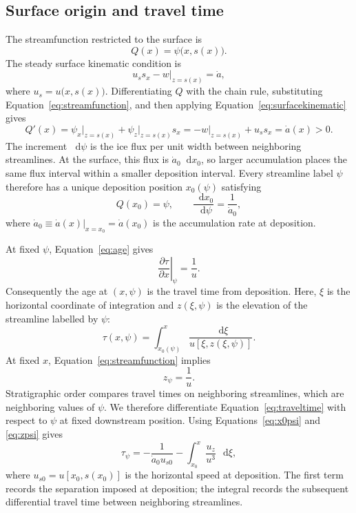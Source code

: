 \documentclass[review]{igs}
\theoremstyle{definition}
\theoremstyle{remark}
\newcommand{\dd}{\mathop{}\!\mathrm{d}}
\begin{document}
\subsection{Surface origin and travel time}

The streamfunction restricted to the surface is
\begin{equation}
Q(x)=\psi\bigl(x,s(x)\bigr).
\end{equation}
The steady surface kinematic condition is
\begin{equation}
 u_s s_x-w\bigg|_{z=s(x)}=\dot a,
\label{eq:surfacekinematic}
\end{equation}
where \(u_s=u\bigl(x,s(x)\bigr)\). Differentiating \(Q\) with the chain rule, substituting Equation~\eqref{eq:streamfunction}, and then applying Equation~\eqref{eq:surfacekinematic} gives
\begin{equation}
Q'(x)
=\psi_x\bigg|_{z=s(x)}+\psi_z\bigg|_{z=s(x)}s_x
=-w\bigg|_{z=s(x)}+u_ss_x
=\dot a(x)>0.
\label{eq:Qprime}
\end{equation}
The increment \(\dd\psi\) is the ice flux per unit width between neighboring streamlines. At the surface, this flux is \(\dot a_0\dd x_0\), so larger accumulation places the same flux interval within a smaller deposition interval. Every streamline label \(\psi\) therefore has a unique deposition position \(x_0(\psi)\) satisfying
\begin{equation}
Q(x_0)=\psi,
\qquad
\frac{\dd x_0}{\dd\psi}=\frac{1}{\dot a_0},
\label{eq:x0psi}
\end{equation}
where \(\dot a_0\equiv\left.\dot a(x)\right|_{x=x_0}=\dot a(x_0)\) is the accumulation rate at deposition.

At fixed \(\psi\), Equation~\eqref{eq:age} gives
\begin{equation}
\left.\frac{\partial\tau}{\partial x}\right|_{\psi}=\frac{1}{u}.
\end{equation}
Consequently the age at \((x,\psi)\) is the travel time from deposition. Here, \(\xi\) is the horizontal coordinate of integration and \(z(\xi,\psi)\) is the elevation of the streamline labelled by \(\psi\):
\begin{equation}
\tau(x,\psi)=\int_{x_0(\psi)}^{x}
\frac{\dd\xi}{u\left[\xi,z(\xi,\psi)\right]}.
\label{eq:traveltime}
\end{equation}
At fixed \(x\), Equation~\eqref{eq:streamfunction} implies
\begin{equation}
 z_{\psi}=\frac{1}{u}.
\label{eq:zpsi}
\end{equation}
Stratigraphic order compares travel times on neighboring streamlines, which are neighboring values of \(\psi\). We therefore differentiate Equation~\eqref{eq:traveltime} with respect to \(\psi\) at fixed downstream position. Using Equations~\eqref{eq:x0psi} and \eqref{eq:zpsi} gives
\begin{equation}
\tau_{\psi}
=-\frac{1}{\dot a_0u_{s0}}
-\int_{x_0}^{x}\frac{u_z}{u^3}\,\dd\xi,
\label{eq:taupsi}
\end{equation}
where \(u_{s0}=u\left[x_0,s(x_0)\right]\) is the horizontal speed at deposition. The first term records the separation imposed at deposition; the integral records the subsequent differential travel time between neighboring streamlines.
\end{document}
